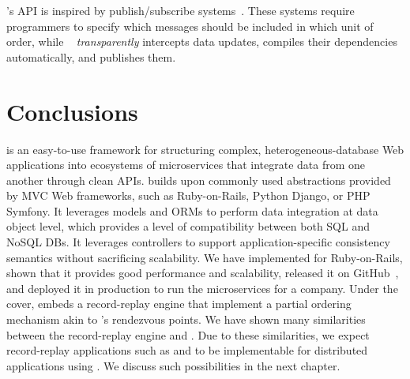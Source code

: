 \synapse's API is inspired by publish/subscribe systems~\cite{siena,scribe,thialfi,gryphon,hermes}.
These systems require programmers to specify which
messages should be included in which unit of order, while \synapse \ {\em
transparently} intercepts data updates, compiles their dependencies
automatically, and publishes them.

\section{Conclusions} \label{sec:conclusion}

\synapse is an easy-to-use framework for structuring complex,
heterogeneous-database Web applications into ecosystems of microservices that
integrate data from one another through clean APIs.  \synapse builds upon
commonly used abstractions provided by MVC Web frameworks, such as
Ruby-on-Rails, Python Django, or PHP Symfony. It leverages models and ORMs to
perform data integration at data object level, which provides a level of
compatibility between both SQL and NoSQL DBs. It leverages controllers to
support application-specific consistency semantics without sacrificing
scalability.  We have implemented \synapse for Ruby-on-Rails,
shown that it provides good performance and scalability, released it
on GitHub~\cite{synapse-sources}, and deployed it in production to
run the microservices for a company.
Under the cover, \synapse embeds a record-replay engine that implement a partial
ordering mechanism akin to \scribe's rendezvous points. We have shown many
similarities between the \scribe record-replay engine and \synapse.
Due to these similarities, we expect record-replay applications such as \racepro
and \dora to be implementable for distributed applications using \synapse.  We
discuss such possibilities in the next chapter.

